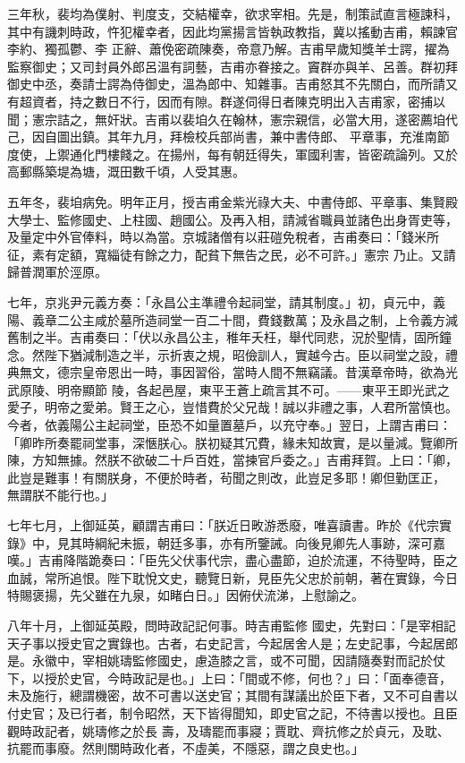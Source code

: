 \begin{pinyinscope}
 三年秋，裴均為僕射、判度支，交結權幸，欲求宰相。先是，制策試直言極諫科，其中有譏刺時政，忤犯權幸者，因此均黨揚言皆執政教指，冀以搖動吉甫，賴諫官李約、獨孤鬱、李
 正辭、蕭俛密疏陳奏，帝意乃解。吉甫早歲知獎羊士諤，擢為監察御史；又司封員外郎呂溫有詞藝，吉甫亦眷接之。竇群亦與羊、呂善。群初拜御史中丞，奏請士諤為侍御史，溫為郎中、知雜事。吉甫怒其不先關白，而所請又有超資者，持之數日不行，因而有隙。群遂伺得日者陳克明出入吉甫家，密捕以聞；憲宗詰之，無奸狀。吉甫以裴垍久在翰林，憲宗親信，必當大用，遂密薦垍代己，因自圖出鎮。其年九月，拜檢校兵部尚書，兼中書侍郎、
 平章事，充淮南節度使，上禦通化門樓餞之。在揚州，每有朝廷得失，軍國利害，皆密疏論列。又於高郵縣築堤為塘，溉田數千頃，人受其惠。



 五年冬，裴垍病免。明年正月，授吉甫金紫光祿大夫、中書侍郎、平章事、集賢殿大學士、監修國史、上柱國、趙國公。及再入相，請減省職員並諸色出身胥吏等，及量定中外官俸料，時以為當。京城諸僧有以莊磑免稅者，吉甫奏曰：「錢米所征，素有定額，寬緇徒有餘之力，配貧下無告之民，必不可許。」憲宗
 乃止。又請歸普潤軍於涇原。



 七年，京兆尹元義方奏：「永昌公主準禮令起祠堂，請其制度。」初，貞元中，義陽、義章二公主咸於墓所造祠堂一百二十間，費錢數萬；及永昌之制，上令義方減舊制之半。吉甫奏曰：「伏以永昌公主，稚年夭枉，舉代同悲，況於聖情，固所鐘念。然陛下猶減制造之半，示折衷之規，昭儉訓人，實越今古。臣以祠堂之設，禮典無文，德宗皇帝恩出一時，事因習俗，當時人間不無竊議。昔漢章帝時，欲為光武原陵、明帝顯節
 陵，各起邑屋，東平王蒼上疏言其不可。——東平王即光武之愛子，明帝之愛弟。賢王之心，豈惜費於父兄哉！誠以非禮之事，人君所當慎也。今者，依義陽公主起祠堂，臣恐不如量置墓戶，以充守奉。」翌日，上謂吉甫曰：「卿昨所奏罷祠堂事，深愜朕心。朕初疑其冗費，緣未知故實，是以量減。覽卿所陳，方知無據。然朕不欲破二十戶百姓，當揀官戶委之。」吉甫拜賀。上曰：「卿，此豈是難事！有關朕身，不便於時者，茍聞之則改，此豈足多耶！卿但勤匡正，
 無謂朕不能行也。」



 七年七月，上御延英，顧謂吉甫曰：「朕近日畋游悉廢，唯喜讀書。昨於《代宗實錄》中，見其時綱紀未振，朝廷多事，亦有所鑒誡。向後見卿先人事跡，深可嘉嘆。」吉甫降階跪奏曰：「臣先父伏事代宗，盡心盡節，迫於流運，不待聖時，臣之血誠，常所追恨。陛下耽悅文史，聽覽日新，見臣先父忠於前朝，著在實錄，今日特賜褒揚，先父雖在九泉，如睹白日。」因俯伏流涕，上慰諭之。



 八年十月，上御延英殿，問時政記記何事。時吉甫監修
 國史，先對曰：「是宰相記天子事以授史官之實錄也。古者，右史記言，今起居舍人是；左史記事，今起居郎是。永徽中，宰相姚璹監修國史，慮造膝之言，或不可聞，因請隨奏對而記於仗下，以授於史官，今時政記是也。」上曰：「間或不修，何也？」曰：「面奉德音，未及施行，總謂機密，故不可書以送史官；其間有謀議出於臣下者，又不可自書以付史官；及已行者，制令昭然，天下皆得聞知，即史官之記，不待書以授也。且臣觀時政記者，姚璹修之於長
 壽，及璹罷而事寢；賈耽、齊抗修之於貞元，及耽、抗罷而事廢。然則關時政化者，不虛美，不隱惡，謂之良史也。」




\end{pinyinscope}
